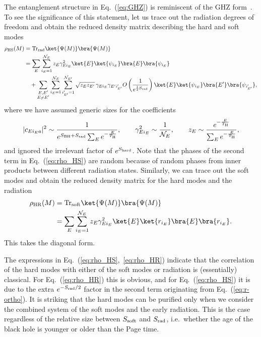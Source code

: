 \documentclass[12pt]{article}
\begin{document}
The entanglement structure in Eq.~(\ref{eq:GHZ}) is reminiscent of 
the GHZ form~\cite{GHZ}.  To see the significance of this statement, 
let us trace out the radiation degrees of freedom and obtain the 
reduced density matrix describing the hard and soft modes
%
\begin{align}
  \rho_{\rm HS}(M) &= {\rm Tr}_{\rm rad} \ket{\Psi(M)} \bra{\Psi(M)}
\nonumber\\
  &= \sum_E \sum_{i_E=1}^{{\cal N}_E} z_E \gamma_{E i_E}^2 
    \ket{E} \ket{\psi_{i_E}} \bra{E} \bra{\psi_{i_E}} 
\nonumber\\
  & {} \quad + \sum_{\substack{E,E' \\ E \neq E'}} 
    \sum_{i_E=1}^{{\cal N}_E} \sum_{i'_{E'}=1}^{{\cal N}_{E'}} 
    \sqrt{z_E z_{E'}}\, \gamma_{E i_E} \gamma_{E' i'_{E'}} 
    O\left( \frac{1}{e^{\frac{1}{2}S_{\rm rad}}} \right)
    \ket{E} \ket{\psi_{i_E}} \bra{E'} \bra{\psi_{i'_{E'}}},
\label{eq:rho_HS}
\end{align}
%
where we have assumed generic sizes for the coefficients
%
\begin{equation}
  |c_{E i_E a}|^2 \sim \frac{1}{e^{S_{\rm BH} + S_{\rm rad}} 
    \sum_E e^{-\frac{E}{T_{\rm H}}}},
\qquad
  \gamma_{E i_E}^2 \sim \frac{1}{{\cal N}_E},
\qquad
  z_E \sim 
    \frac{e^{-\frac{E}{T_{\rm H}}}}{\sum_E e^{-\frac{E}{T_{\rm H}}}},
\label{eq:generic}
\end{equation}
%
and ignored the irrelevant factor of $e^{S_{\rm hard}}$.  Note that 
the phases of the second term in Eq.~(\ref{eq:rho_HS}) are random 
because of random phases from inner products between different 
radiation states.  Similarly, 
we can trace out the soft modes and obtain the reduced density 
matrix for the hard modes and the radiation
%
\begin{align}
  \rho_{\rm HR}(M) &= {\rm Tr}_{\rm soft} \ket{\Psi(M)} \bra{\Psi(M)}
\nonumber\\
  &= \sum_E \sum_{i_E=1}^{{\cal N}_E} z_E \gamma_{E i_E}^2 
    \ket{E} \ket{r_{i_E}} \bra{E} \bra{r_{i_E}}.
\label{eq:rho_HR}
\end{align}
%
This takes the diagonal form.

The expressions in Eq.~(\ref{eq:rho_HS},~\ref{eq:rho_HR}) indicate 
that the correlation of the hard modes with either of the soft modes 
or radiation is (essentially) classical.  For Eq.~(\ref{eq:rho_HR}) 
this is obvious, and for Eq.~(\ref{eq:rho_HS}) it is due to the 
extra $e^{-S_{\rm rad}/2}$ factor in the second term originating 
from Eq.~(\ref{eq:r-ortho}).  It is striking that the hard modes 
can be purified only when we consider the combined system of the 
soft modes and the early radiation.  This is the case regardless 
of the relative size between $S_{\rm soft}$ and $S_{\rm rad}$, 
i.e.\ whether the age of the black hole is younger or older than 
the Page time.
\end{document}

